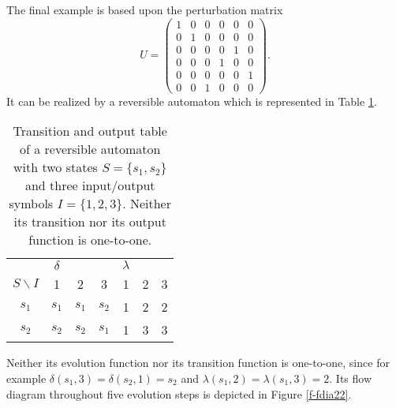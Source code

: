 The final example is based upon the perturbation matrix
$$
{U}=
\left(
\begin{array}{cccccc}
1&0&0&0&0&0 \\
0&1&0&0&0&0 \\
0&0&0&0&1&0 \\
0&0&0&1&0&0 \\
0&0&0&0&0&1 \\
0&0&1&0&0&0
\end{array}
\right).
$$
It can be realized by a reversible automaton which is represented in
Table
\ref{t-ra22}.
\begin{table}
\begin{center}
\begin{tabular}{|c|ccc|ccc|}
 \hline\hline
 &$\delta$ & && $\lambda$&&\\
$S\backslash I$ &1&2&3& 1&2&3\\
 \hline
$s_1$&$s_1$&$s_1$ &$s_2$ & 1&2&2\\
$s_2$&$s_2$&$s_2$ &$s_1$ & 1&3&3\\
 \hline\hline
\end{tabular}
\end{center}
\caption{Transition and output table of a reversible
automaton  with two states $S=\{s_1, s_2\}$ and three
input/output symbols $I= \{1,2,3\}$.
Neither its  transition nor its output function is one-to-one.
\label{t-ra22}}
\end{table}
Neither its
evolution function nor its transition function is one-to-one, since for
example
$
\delta (s_1,3)
=
\delta (s_2,1)=s_2
$
and
$
\lambda (s_1,2)
=
\lambda (s_1,3)=2
$.
Its flow diagram throughout five evolution steps is depicted in Figure
\ref{f-fdia22}.
